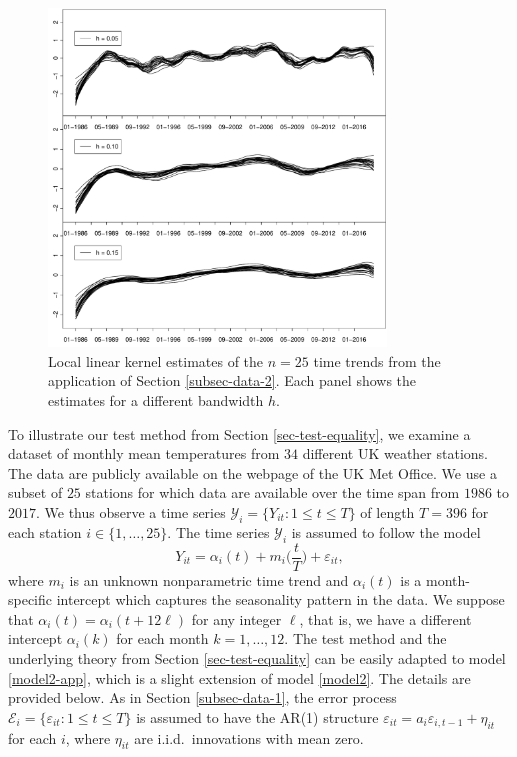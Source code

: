 \begin{figure}[t]
\centering
\includegraphics[width=0.8\textwidth]{Plots/stations_data.pdf}
\vspace{0.2cm}
\caption{Local linear kernel estimates of the $n=25$ time trends from the application of Section \ref{subsec-data-2}. Each panel shows the estimates for a different bandwidth $h$.}\label{plot-results-app2}
\end{figure}


To illustrate our test method from Section \ref{sec-test-equality}, we examine a dataset of monthly mean temperatures from $34$ different UK weather stations. The data are publicly available on the webpage of the UK Met Office. We use a subset of $25$ stations for which data are available over the time span from $1986$ to $2017$. We thus observe a time series $\mathcal{Y}_i = \{Y_{it}: 1 \le t \le T \}$ of length $T = 396$ for each station $i \in \{1,\ldots,25\}$. The time series $\mathcal{Y}_i$ is assumed to follow the model 
\begin{equation}\label{model2-app}
Y_{it} = \alpha_i(t) + m_i\Big(\frac{t}{T}\Big) + \varepsilon_{it}, 
\end{equation}
where $m_i$ is an unknown nonparametric time trend and $\alpha_i(t)$ is a month-specific intercept which captures the seasonality pattern in the data. We suppose that $\alpha_i(t) = \alpha_i(t + 12 \ell)$ for any integer $\ell$, that is, we have a different intercept $\alpha_i(k)$ for each month $k = 1,\ldots,12$. The test method and the underlying theory from Section \ref{sec-test-equality} can be easily adapted to model \eqref{model2-app}, which is a slight extension of model \eqref{model2}. The details are provided below. As in Section \ref{subsec-data-1}, the error process $\mathcal{E}_i = \{ \varepsilon_{it}: 1 \le t \le T \}$ is assumed to have the AR(1) structure $\varepsilon_{it} = a_i \varepsilon_{i,t-1} + \eta_{it}$ for each $i$, where $\eta_{it}$ are i.i.d.\ innovations with mean zero.  


